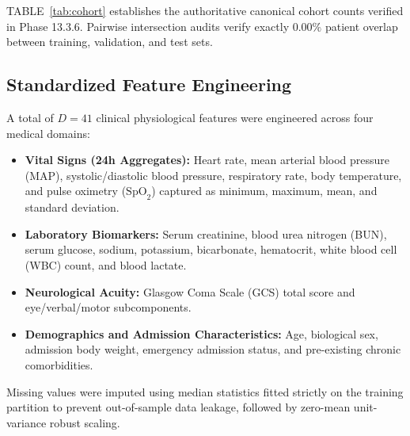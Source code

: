 \documentclass[conference]{IEEEtran}
\begin{document}
TABLE~\ref{tab:cohort} establishes the authoritative canonical cohort counts verified in Phase 13.3.6. Pairwise intersection audits verify exactly $0.00\%$ patient overlap between training, validation, and test sets.

\begin{table}[!t]
\centering
\caption{Authoritative Clinical 24-Hour Landmark Cohort Statistics Across Patient-Disjoint Partitions}
\label{tab:cohort}
\end{table}

\subsection{Standardized Feature Engineering}
A total of $D = 41$ clinical physiological features were engineered across four medical domains:
\begin{itemize}
    \item \textbf{Vital Signs (24h Aggregates):} Heart rate, mean arterial blood pressure (MAP), systolic/diastolic blood pressure, respiratory rate, body temperature, and pulse oximetry ($\text{SpO}_2$) captured as minimum, maximum, mean, and standard deviation.
    \item \textbf{Laboratory Biomarkers:} Serum creatinine, blood urea nitrogen (BUN), serum glucose, sodium, potassium, bicarbonate, hematocrit, white blood cell (WBC) count, and blood lactate.
    \item \textbf{Neurological Acuity:} Glasgow Coma Scale (GCS) total score and eye/verbal/motor subcomponents.
    \item \textbf{Demographics and Admission Characteristics:} Age, biological sex, admission body weight, emergency admission status, and pre-existing chronic comorbidities.
\end{itemize}
Missing values were imputed using median statistics fitted strictly on the training partition to prevent out-of-sample data leakage, followed by zero-mean unit-variance robust scaling.
\end{document}

